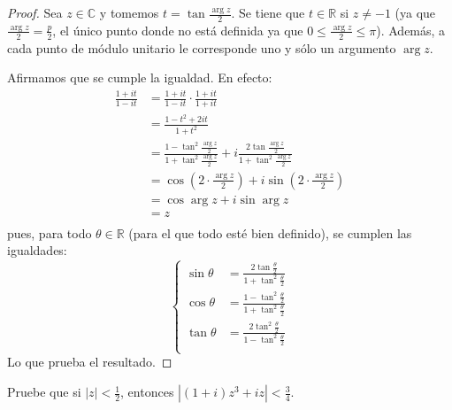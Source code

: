 \documentclass[12pt]{report}
\theoremstyle{largebreak}
\newcommand\abs[1]{\ensuremath{\left|#1\right|}}
\begin{document}
    \begin{proof}
        Sea $z\in\mathbb{C}$ y tomemos $t=\tan\frac{\arg z}{2}$. Se tiene que $t\in\mathbb{R}$ si $z\neq-1$ (ya que $\frac{\arg z}{2}=\frac{p}{2}$, el único punto donde no está definida ya que $0\leq\frac{\arg z}{2}\leq\pi$). Además, a cada punto de módulo unitario le corresponde uno y sólo un argumento $\arg z$.

        Afirmamos que se cumple la igualdad. En efecto:
        \begin{equation*}
            \begin{split}
                \frac{1+it}{1-it}&=\frac{1+it}{1-it}\cdot\frac{1+it}{1+it}\\
                &=\frac{1-t^2+2it}{1+t^2}\\
                &=\frac{1-\tan^2\frac{\arg z}{2}}{1+\tan^2\frac{\arg z}{2}}+i\frac{2\tan\frac{\arg z}{2}}{1+\tan^2\frac{\arg z}{2}}\\
                &=\cos\left(2\cdot\frac{\arg z}{2}\right)+i\sin\left(2\cdot\frac{\arg z}{2}\right)\\
                &=\cos\arg z+i\sin\arg z\\
                &=z\\
            \end{split}
        \end{equation*}
        pues, para todo $\theta\in\mathbb{R}$ (para el que todo esté bien definido), se cumplen las igualdades:
        \begin{equation*}
            \left\{
                \begin{array}{rl}
                    \sin\theta &= \frac{2\tan\frac{\theta}{2}}{1+\tan^2\frac{\theta}{2}}\\
                    \cos\theta &= \frac{1-\tan^2\frac{\theta}{2}}{1+\tan^2\frac{\theta}{2}}\\
                    \tan\theta &= \frac{2\tan^2\frac{\theta}{2}}{1-\tan^2\frac{\theta}{2}}\\
                \end{array}
            \right.
        \end{equation*}
        Lo que prueba el resultado.
    \end{proof}

    \begin{excer}
        Pruebe que si $\abs{z}<\frac{1}{2}$, entonces $\abs{(1+i)z^3+iz}<\frac{3}{4}$.
    \end{excer}
\end{document}
